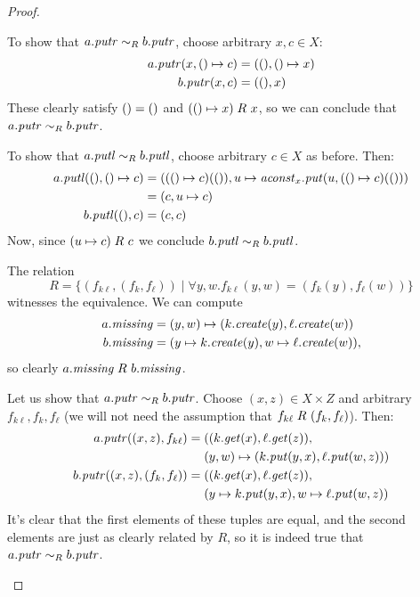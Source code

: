 \begin{defn}[$R$-similarity]
\begin{theorem}
\begin{lemma}
\begin{theorem}[No products]
\begin{lemma}
\begin{defn}
\begin{theorem}
\begin{theorem}
\begin{corollary}[Hylomorphism]
\begin{defn}
\begin{defn}
\begin{defn}[Symmetrization]
\begin{proof}
\begin{longenum}
To show that $a.\mathit{putr} \sim_R b.\mathit{putr}$, choose arbitrary $x,c \in X$:
\begin{align*}
    a.\mathit{putr}(x,{()} \mapsto c) &= ({()},{()} \mapsto x) \\
    b.\mathit{putr}(x,c) &= ({()},x)
\end{align*}
These clearly satisfy ${()} = {()}$ and $({()} \mapsto x) \mathrel{R_{}} x$, so we
can conclude that $a.\mathit{putr} \sim_R b.\mathit{putr}$.

To show that $a.\mathit{putl} \sim_R b.\mathit{putl}$, choose arbitrary $c \in X$ as before.
Then:
\begin{align*}
    a.\mathit{putl}({()},{()} \mapsto c) &= (({()} \mapsto c)({()}),u \mapsto
    \mathit{aconst}_x.\mathit{put}(u,({()} \mapsto c)({()})) \\
    &= (c,u \mapsto c) \\
    b.\mathit{putl}({()},c) &= (c,c)
\end{align*}
Now, since  $(u \mapsto c) \mathrel{R_{}} c$ we conclude
$b.\mathit{putl} \sim_R b.\mathit{putl}$.

\item The relation
\[R = \{(f_{k\ell},(f_k,f_\ell)) \mid \forall y,w. f_{k\ell}(y,w)=(f_k(y),f_\ell(w)) \}\]
witnesses the equivalence. We can compute
\begin{align*}
    a.\mathit{missing} &= (y,w) \mapsto (k.\mathit{create}(y),\ell.\mathit{create}(w)) \\
    b.\mathit{missing} &= (y \mapsto k.\mathit{create}(y),w \mapsto \ell.\mathit{create}(w)),
\end{align*}
so clearly $a.\mathit{missing} \mathrel{R_{}} b.\mathit{missing}$.

Let us show that $a.\mathit{putr} \sim_R b.\mathit{putr}$. Choose $(x,z) \in X \times Z$ and
arbitrary $f_{k\ell},f_k,f_\ell$ (we will not need the assumption that
$f_{k\ell} \mathrel{R_{}} (f_k,f_\ell)$). Then:
\begin{align*}
    a.\mathit{putr}((x,z),f_{k\ell}) ={}
    & ((k.\mathit{get}(x),\ell.\mathit{get}(z)), \\
    & (y,w) \mapsto (k.\mathit{put}(y,x),\ell.\mathit{put}(w,z))) \\
    b.\mathit{putr}((x,z),(f_k,f_\ell)) ={}
    & ((k.\mathit{get}(x),\ell.\mathit{get}(z)), \\
    & (y \mapsto k.\mathit{put}(y,x),w \mapsto \ell.\mathit{put}(w,z))
\end{align*}
It's clear that the first elements of these tuples are equal, and the second
elements are just as clearly related by $R$, so it is indeed true that
$a.\mathit{putr} \sim_R b.\mathit{putr}$.


\end{longenum}
\end{proof}
\end{defn}
\end{defn}
\end{defn}
\end{corollary}
\end{theorem}
\end{theorem}
\end{defn}
\end{lemma}
\end{theorem}
\end{lemma}
\end{theorem}
\end{defn}
